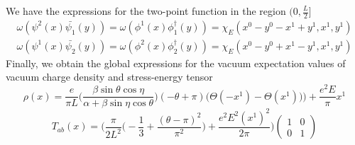 We have the expressions for the two-point function in the region $(0, \frac{L}{2}]$
\begin{equation*}
\begin{split}
\omega(\psi^2(x) \bar{\psi_1}(y)) = 
\omega(\phi^1(x) \phi^\dagger_1(y)) = \chi_E(x^0 - y^0 - x^1 + y^1, x^1, y^1) \\
 \omega(\psi^1(x) \bar{\psi_2}(y)) = 
\omega(\phi^2(x) \phi^\dagger_2(y)) = \chi_E(x^0 - y^0 + x^1 - y^1, x^1, y^1)
\end{split}
\end{equation*}
Finally, we obtain the global expressions for the vacuum expectation values of vacuum charge density and stress-energy tensor 
\begin{equation}
\rho(x) = \frac{e}{\pi L}\Big( \frac{\beta \sin \theta \cos \eta}{\alpha + \beta \sin \eta \cos \theta}\Big) (-\theta + \pi)
\Big(\Theta(- x^1) - \Theta(x^1))\Big) + \frac{e^2 E}{\pi} x^1
\end{equation}
\begin{equation}
T_{ab}(x) = 
\bigg( \frac{\pi}{2L^2}\big( -\frac{1}{3} + \frac{(\theta - \pi)^2}{\pi^2}\big) + \frac{e^2E^2(x^1)^2}{2 \pi} \bigg)
\begin{pmatrix}
1 & 0 \\ 0 & 1
\end{pmatrix}
\end{equation}
